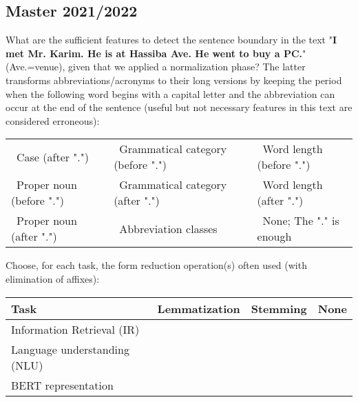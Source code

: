 \documentclass[11pt, a4paper]{article}
\begin{document}
\subsection{Master 2021/2022}

What are the sufficient features to detect the sentence boundary in the text "\textbf{I met Mr. Karim. He is at Hassiba Ave. He went to buy a PC.}" (Ave.=venue), given that we applied a normalization phase? 
The latter transforms abbreviations/acronyms to their long versions by keeping the period when the following word begins with a capital letter and the abbreviation can occur at the end of the sentence (useful but not necessary features in this text are considered erroneous):
\begin{center}
	\begin{tabular}{|lll|}
		\hline
		\Square\ Case (after ".") &
		\Square\ Grammatical category (before ".") &
		\Square\ Word length (before ".") \\
		\Square\ Proper noun (before ".") &
		\Square\ Grammatical category (after ".") &
		\Square\ Word length (after ".") \\
		\Square\ Proper noun (after ".") &
		\Square\ Abbreviation classes &
		\Square\ None; The "." is enough \\
		\hline
	\end{tabular}
\end{center}

Choose, for each task, the form reduction operation(s) often used (with elimination of affixes):
\begin{center}
	\begin{tabular}{|llll|}
		\hline
		Task & Lemmatization & Stemming & None \\
		\hline
		Information Retrieval (IR) & \Square & \Square & \Square \\
		Language understanding (NLU) & \Square & \Square & \Square \\
		BERT representation & \Square & \Square & \Square \\
		\hline
	\end{tabular}
\end{center}
\end{document}
